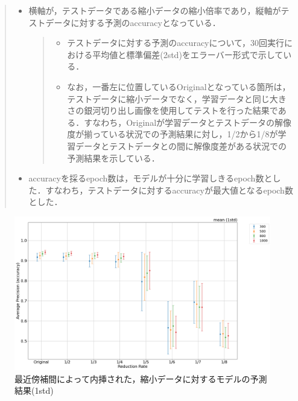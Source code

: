\documentclass[a4j, 11pt]{jreport}
\begin{document}
\begin{quote}
 \begin{itemize}
  \item 横軸が，テストデータである縮小データの縮小倍率であり，縦軸がテストデータに対する予測のaccuracyとなっている．
  \begin{quote}
   \begin{itemize}
    \item テストデータに対する予測のaccuracyについて，30回実行における平均値と標準偏差(2std)をエラーバー形式で示している．
    \item なお，一番左に位置しているOriginalとなっている箇所は，テストデータに縮小データでなく，学習データと同じ大きさの銀河切り出し画像を使用してテストを行った結果である．すなわち，Originalが学習データとテストデータの解像度が揃っている状況での予測結果に対し，1/2から1/8が学習データとテストデータとの間に解像度差がある状況での予測結果を示している．
   \end{itemize}
  \end{quote}
  \item accuracyを採るepoch数は，モデルが十分に学習しきるepoch数とした．すなわち，テストデータに対するaccuracyが最大値となるepoch数とした．
 \end{itemize}
\end{quote}

\begin{figure}[H]
  \centering
  \includegraphics[width=1.0\hsize, keepaspectratio]{images/5syou/print_errorbar/nearest/acc_with_errorbar_syuron5_nearest_900epoch_30run_num_of_gal_comparison_acc_max_std1sigma.png}
  \caption{最近傍補間によって内挿された，縮小データに対するモデルの予測結果(1std)}
  \label{fig:nearest_num_of_gal_comparison_1std}
\end{figure}
\end{document}

